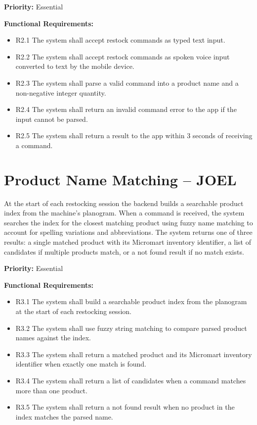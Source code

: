 \documentclass{scrreprt}
\begin{document}
\textbf{Priority:} Essential

\textbf{Functional Requirements:}
\begin{itemize}
    \item R2.1 The system shall accept restock commands as typed text input.
    \item R2.2 The system shall accept restock commands as spoken voice 
    input converted to text by the mobile device.
    \item R2.3 The system shall parse a valid command into a product name 
    and a non-negative integer quantity.
    \item R2.4 The system shall return an invalid command error to the app 
    if the input cannot be parsed.
    \item R2.5 The system shall return a result to the app within 3 seconds 
    of receiving a command.
\end{itemize}

\section{Product Name Matching -- JOEL}
At the start of each restocking session the backend builds a searchable 
product index from the machine's planogram. When a command is received, 
the system searches the index for the closest matching product using 
fuzzy name matching to account for spelling variations and abbreviations. 
The system returns one of three results: a single matched product with 
its Micromart inventory identifier, a list of candidates if multiple 
products match, or a not found result if no match exists.

\textbf{Priority:} Essential

\textbf{Functional Requirements:}
\begin{itemize}
    \item R3.1 The system shall build a searchable product index from the 
    planogram at the start of each restocking session.
    \item R3.2 The system shall use fuzzy string matching to compare parsed 
    product names against the index.
    \item R3.3 The system shall return a matched product and its Micromart 
    inventory identifier when exactly one match is found.
    \item R3.4 The system shall return a list of candidates when a command 
    matches more than one product.
    \item R3.5 The system shall return a not found result when no product 
    in the index matches the parsed name.
\end{itemize}
\end{document}
